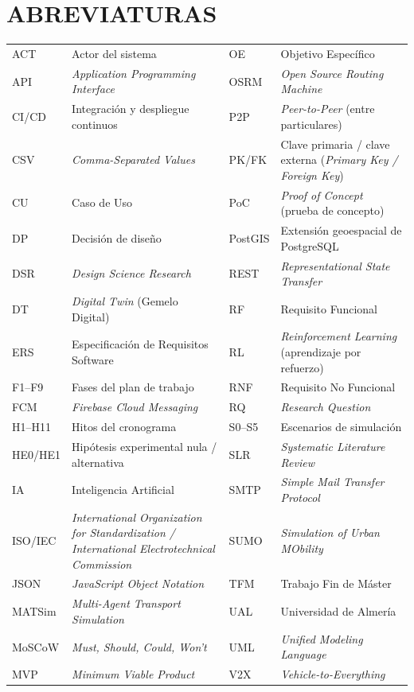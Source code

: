 \section*{ABREVIATURAS}
\noindent
\begin{tabularx}{\textwidth}{|Y{0.4600}|Y{1.5400}|Y{0.4600}|Y{1.5400}|}
\hline
ACT & Actor del sistema & OE & Objetivo Específico \\
API & \textit{Application Programming Interface} & OSRM & \textit{Open Source Routing Machine} \\
CI/CD & Integración y despliegue continuos & P2P & \textit{Peer-to-Peer} (entre particulares) \\
CSV & \textit{Comma-Separated Values} & PK/FK & Clave primaria / clave externa (\textit{Primary Key / Foreign Key}) \\
CU & Caso de Uso & PoC & \textit{Proof of Concept} (prueba de concepto) \\
DP & Decisión de diseño & PostGIS & Extensión geoespacial de PostgreSQL \\
DSR & \textit{Design Science Research} & REST & \textit{Representational State Transfer} \\
DT & \textit{Digital Twin} (Gemelo Digital) & RF & Requisito Funcional \\
ERS & Especificación de Requisitos Software & RL & \textit{Reinforcement Learning} (aprendizaje por refuerzo) \\
F1--F9 & Fases del plan de trabajo & RNF & Requisito No Funcional \\
FCM & \textit{Firebase Cloud Messaging} & RQ & \textit{Research Question} \\
H1--H11 & Hitos del cronograma & S0--S5 & Escenarios de simulación \\
HE0/HE1 & Hipótesis experimental nula / alternativa & SLR & \textit{Systematic Literature Review} \\
IA & Inteligencia Artificial & SMTP & \textit{Simple Mail Transfer Protocol} \\
ISO/IEC & \textit{International Organization for Standardization / International Electrotechnical Commission} & SUMO & \textit{Simulation of Urban MObility} \\
JSON & \textit{JavaScript Object Notation} & TFM & Trabajo Fin de Máster \\
MATSim & \textit{Multi-Agent Transport Simulation} & UAL & Universidad de Almería \\
MoSCoW & \textit{Must, Should, Could, Won't} & UML & \textit{Unified Modeling Language} \\
MVP & \textit{Minimum Viable Product} & V2X & \textit{Vehicle-to-Everything} \\
\hline
\end{tabularx}

